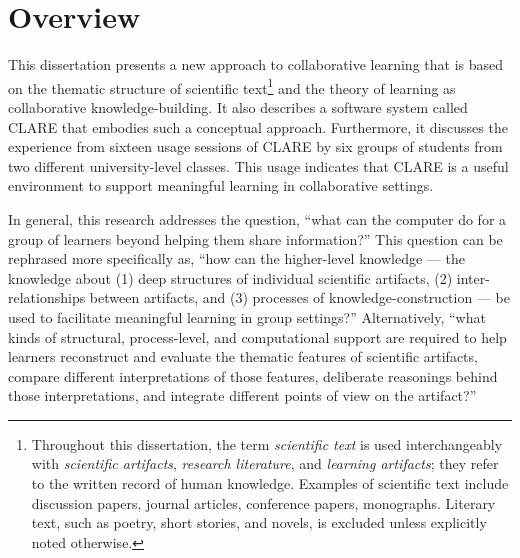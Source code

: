 \setcounter{chapter}{0}
\chapter{Overview}
\label{sec:overview}

This dissertation presents a new approach to collaborative learning that is
based on the thematic structure of scientific text\footnote{Throughout this
dissertation, the term {\it scientific text\/} is used interchangeably with
{\it scientific artifacts\/}, {\it research literature\/}, and {\it
learning artifacts\/}; they refer to the written record of human
knowledge. Examples of scientific text include discussion papers, journal
articles, conference papers, monographs. Literary text, such as poetry,
short stories, and novels, is excluded unless explicitly noted otherwise.}
and the theory of learning as collaborative knowledge-building. It also
describes a software system called CLARE that embodies such a conceptual
approach. Furthermore, it discusses the experience from sixteen usage
sessions of CLARE by six groups of students from two different
university-level classes. This usage indicates that CLARE is a useful
environment to support meaningful learning in collaborative settings.

In general, this research addresses the question, ``what can the computer
do for a group of learners beyond helping them share information?''  This
question can be rephrased more specifically as, ``how can the higher-level
knowledge --- the knowledge about (1) deep structures of individual
scientific artifacts, (2) inter-relationships between artifacts, and (3)
processes of knowledge-construction --- be used to facilitate meaningful
learning in group settings?'' Alternatively, ``what kinds of structural,
process-level, and computational support are required to help learners
reconstruct and evaluate the thematic features of scientific artifacts,
compare different interpretations of those features, deliberate reasonings
behind those interpretations, and integrate different points of view on the
artifact?''

